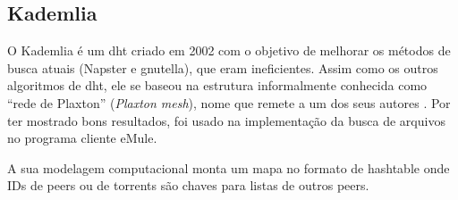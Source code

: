 
\subsection*{Kademlia}

O Kademlia é um \gls*{dht} criado em 2002 \cite{artigo:kademlia} com o objetivo de
melhorar os métodos de busca atuais (Napster e \gls*{gnutella}), que eram ineficientes.
Assim como os outros algoritmos de \gls*{dht}, ele se baseou na estrutura informalmente
conhecida como \enquote{rede de Plaxton} (\emph{Plaxton mesh}), nome que remete a um
dos seus autores \cite{artigo:dht}. Por ter mostrado bons resultados, foi usado na
implementação da busca de arquivos no programa cliente eMule.

A sua modelagem computacional monta um mapa no formato de \gls*{hashtable} onde IDs de
\glspl*{peer} ou de \glspl*{torrent} são chaves para listas de outros \glspl*{peer}.









